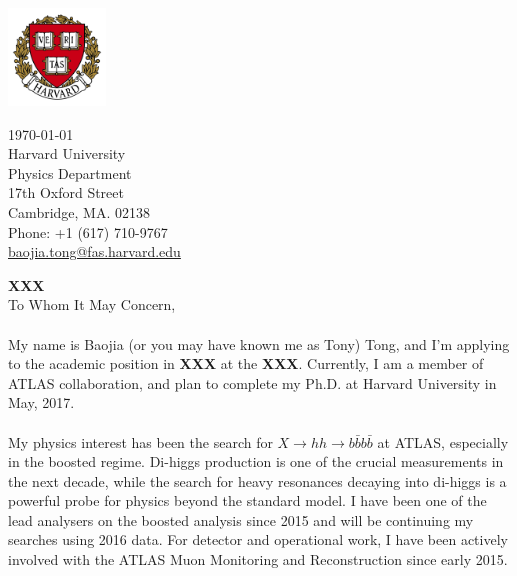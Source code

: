 \documentclass[letterpaper,11pt,oneside]{article}
\begin{document}
\begin{minipage}{.5\textwidth}
  \includegraphics[height=7em]{Harvard}
\end{minipage}
\begin{minipage}{.5\textwidth}
\begin{flushright}
 \today                           \\
 \vspace{1em}                              
 Harvard University            \\
 Physics Department                  \\
 17th Oxford Street                       \\
 Cambridge, MA. 02138   \\
 Phone: +1 (617) 710-9767         \\
\href{mailto:baojia.tong@fas.harvard.edu}{baojia.tong@fas.harvard.edu}  \\ 
\end{flushright}
\end{minipage}

\vspace{2em}
\textbf{XXX}\\
To Whom It May Concern, \\

\onehalfspacing
\paragraph{}
My name is Baojia (or you may have known me as Tony) Tong, and I'm applying to the academic position in \textbf{XXX} at the \textbf{XXX}. Currently, I am a member of ATLAS collaboration, and plan to complete my Ph.D. at Harvard University in May, 2017.

\paragraph{}
My physics interest has been the search for $X \to hh \to b\bar{b}b\bar{b}$ at ATLAS, especially in the boosted regime. Di-higgs production is one of the crucial measurements in the next decade, while the search for heavy resonances decaying into di-higgs is a powerful probe for physics beyond the standard model. I have been one of the lead analysers on the boosted analysis since 2015 and will be continuing my searches using 2016 data. For detector and operational work, I have been actively involved with the ATLAS Muon Monitoring and Reconstruction since early 2015.
\end{document}
